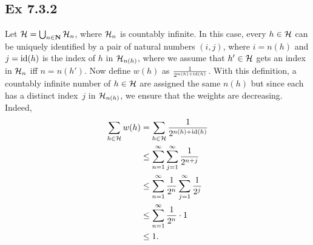 \subsection*{Ex 7.3.2}

Let $\mathcal{H} = \bigcup_{n \in \mathbf{N}} \mathcal{H}_n$, where $\mathcal{H}_n$ is countably infinite.
In this case, every $h \in \mathcal{H}$ can be uniquely identified by a pair of natural numbers
$(i, j)$, where $i = n(h)$ and $j = \operatorname{id} (h)$ is the index of $h$ in $\mathcal{H}_{ n(h) }$, where we assume 
that $h' \in \mathcal{H}$ gets an index in $\mathcal{H}_n$ iff $n = n(h')$. Now define $w(h)$ 
as $\frac{1}{2^{n(h) + \operatorname{id}(h)}}$. With this definition, a countably infinite number of $h \in \mathcal{H}$
are assigned the same $n(h)$ but since each has a distinct index~$j$ in $\mathcal{H}_{n(h)}$, 
we ensure that the weights are decreasing. Indeed, 
\begin{align*}
    \sum_{h \in \mathcal{H}} w(h) & = \sum_{h \in \mathcal{H}} \frac{1}{2^{n(h) + \operatorname{id}(h)}} \\
        & \leq \sum_{n = 1}^{\infty} \sum_{j = 1}^{\infty} \frac{1}{2^{n + j}} \\
        & \leq \sum_{n = 1}^{\infty} \frac{1}{2^n} \sum_{j = 1}^{\infty} \frac{1}{2^j} \\
        & \leq \sum_{n = 1}^{\infty} \frac{1}{2^n} \cdot 1 \\
        & \leq 1.
\end{align*}

